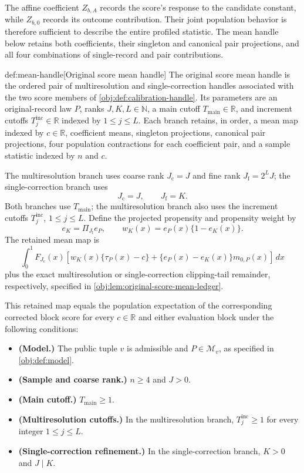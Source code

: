 The affine coefficient \(Z_{b,A}\) records the score's response to the candidate constant, while \(Z_{b,0}\) records its outcome contribution. Their joint population behavior is therefore sufficient to describe the entire profiled statistic. The mean handle below retains both coefficients, their singleton and canonical pair projections, and all four combinations of single-record and pair contributions.

\begin{algorithmv}{def:mean-handle}[Original score mean handle]
The original score mean handle is the ordered pair of multiresolution and single-correction handles associated with the two score members of \cref{obj:def:calibration-handle}. Its parameters are an original-record law \(P\), ranks \(J,K,L\in\mathbb N\), a main cutoff \(T_{\mathrm{main}}\in\mathbb R\), and increment cutoffs \(T_j^{\mathrm{inc}}\in\mathbb R\) indexed by \(1\le j\le L\). Each branch retains, in order, a mean map indexed by \(c\in\mathbb R\), coefficient means, singleton projections, canonical pair projections, four population contractions for each coefficient pair, and a sample statistic indexed by \(n\) and \(c\).

The multiresolution branch uses coarse rank \(J_{\mathrm c}=J\) and fine rank \(J_{\mathrm f}=2^LJ\); the single-correction branch uses
\[
J_{\mathrm c}=J,\qquad J_{\mathrm f}=K.
\]
Both branches use \(T_{\mathrm{main}}\); the multiresolution branch also uses the increment cutoffs \(T_j^{\mathrm{inc}}\), \(1\le j\le L\). Define the projected propensity and propensity weight by
\[
e_K=\Pi_{J_{\mathrm f}}e_P,
\qquad
w_K(x)=e_P(x)\{1-e_K(x)\}.
\]
The retained mean map is
\[
\int_0^1 F_{J_{\mathrm c}}(x)
\left[
w_K(x)\{\tau_P(x)-c\}
+\{e_P(x)-e_K(x)\}m_{0,P}(x)
\right]\,dx
\]
plus the exact multiresolution or single-correction clipping-tail remainder, respectively, specified in \cref{obj:lem:original-score-mean-ledger}.

This retained map equals the population expectation of the corresponding corrected block score for every \(c\in\mathbb R\) and either evaluation block under the following conditions:
\begin{itemize}
\item \textbf{(Model.)} The public tuple \(v\) is admissible and \(P\in\mathcal M_v\), as specified in \cref{obj:def:model}.
\item \textbf{(Sample and coarse rank.)} \(n\ge4\) and \(J>0\).
\item \textbf{(Main cutoff.)} \(T_{\mathrm{main}}\ge1\).
\item \textbf{(Multiresolution cutoffs.)} In the multiresolution branch, \(T_j^{\mathrm{inc}}\ge1\) for every integer \(1\le j\le L\).
\item \textbf{(Single-correction refinement.)} In the single-correction branch, \(K>0\) and \(J\mid K\).
\end{itemize}


\end{algorithmv}
